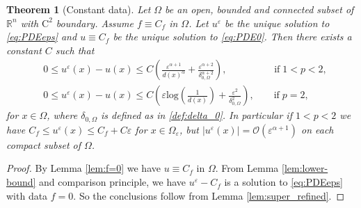 \documentclass[11pt,reqno]{amsart}
\numberwithin{figure}{section}
\theoremstyle{plain}
\newtheorem{thm}{Theorem}[section]
\theoremstyle{remark}
\numberwithin{equation}{section}
\newcommand{\R}{\mathbb{R}}
\begin{document}
\begin{thm}[Constant data]\label{thm:rate_doubling0} Let $\Omega$ be an open, bounded and connected subset of $\R^n$ with $\mathrm{C}^2$ boundary. Assume $f\equiv C_f$ in $\Omega$. Let $u^\varepsilon$ be the unique solution to \eqref{eq:PDEeps} and $u \equiv C_f$ be the unique solution to \eqref{eq:PDE0}. Then there exists a constant $C$ such that 
    \begin{equation*}
    \begin{split}
    &0\leq u^\varepsilon(x) - u(x)\leq C \left(\frac{ \varepsilon^{\alpha+1}}{d(x)^\alpha} + \frac{\varepsilon^{\alpha+2}}{\delta_{0,\Omega}^{\alpha+2}}\right),  \qquad\qquad \;\;\; \text{if}\; 1<p<2,\\
    &0\leq u^\varepsilon(x) - u(x)\leq C \left(\varepsilon \mathrm{log}\left(\frac{1}{d(x)}\right) + \frac{\varepsilon^{2}}{\delta_{0,\Omega}^{2}}\right),  \qquad \text{if}\; p=2,
    \end{split}
\end{equation*}
for $x\in \Omega$, where $\delta_{0,\Omega}$ is defined as in \eqref{def:delta_0}. In particular if $1<p<2$ we have $C_f\leq u^\varepsilon(x)\leq C_f + C\varepsilon$ for $x\in \Omega_\varepsilon$, but $|u^\varepsilon(x)| = \mathcal{O}\left(\varepsilon^{\alpha+1}\right)$ on each compact subset of $\Omega$.
\end{thm}
\begin{proof} By Lemma \ref{lem:f=0} we have $u \equiv C_f$ in $\Omega$. From Lemma \ref{lem:lower-bound} and comparison principle, we have $u^\varepsilon - C_f$ is a solution to \eqref{eq:PDEeps} with data $f = 0$. So the conclusions follow from Lemma \ref{lem:super_refined}.
\end{proof}
\end{document}
